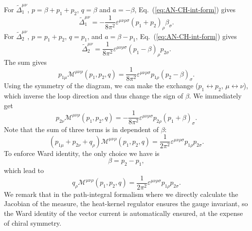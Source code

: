 \documentclass[aps,prb,superscriptaddress,nofootinbib]{revtex4}
\begin{document}
For $\tilde\Delta_{1}^{\mu\nu}$, $p=\beta+p_1+p_2$, $q=\beta$ and $a=-\beta$, Eq.~(\ref{eq:AN-CH-int-form}) gives
\begin{equation}
	\tilde\Delta^{\mu\nu}_1 = -\frac{1}{8\pi^2} \varepsilon^{\mu\nu\rho\sigma} (p_1+p_2)_\rho \beta_{\sigma}.
\end{equation}
For $\tilde\Delta_2^{\mu\nu}$, $p=p_1+p_2$, $q=p_1$, and $a=\beta-p_1$, Eq.~(\ref{eq:AN-CH-int-form}) gives
\begin{equation}
	\tilde\Delta^{\mu\nu}_2 = \frac{1}{8\pi^2} \varepsilon^{\mu\nu\rho\sigma} (p_1-\beta)_\rho p_{2\sigma}.
\end{equation}
The sum gives
\begin{equation}
	p_{1\mu} \mathcal{M}^{\mu\nu\rho}(p_1,p_2,q) = \frac{1}{8\pi^2} \varepsilon^{\mu\nu\rho\sigma} p_{1\rho}(p_{2}-\beta)_\sigma.
\end{equation}
Using the symmetry of the diagram, we can make the exchange ($p_1 \leftrightarrow p_2$, $\mu \leftrightarrow \nu$), which inverse the loop direction and thus change the sign of $\beta$.
We immediately get
\begin{equation}
	p_{2\nu} \mathcal{M}^{\mu\nu\rho}(p_1,p_2,q) = -\frac{1}{8\pi^2} \varepsilon^{\mu\nu\rho\sigma} p_{2\rho}(p_{1}+\beta)_\sigma.
\end{equation}
Note that the sum of three terms is in dependent of $\beta$:
\begin{equation}
	(p_{1\mu}+p_{2\nu}+q_{\rho}) \mathcal M^{\mu\nu\rho}(p_1,p_2,q) = \frac{1}{2\pi^2} \varepsilon^{\mu\nu\rho\sigma} p_{1\rho} p_{2\sigma}.
\end{equation}
To enforce Ward identity, the only choice we have is
\begin{equation}
	\beta = p_2-p_1,
\end{equation}
which lead to
\begin{equation}
	q_\rho \mathcal{M}^{\mu\nu\rho}(p_1,p_2,q) = \frac{1}{2\pi^2} \varepsilon^{\mu\nu\rho\sigma} p_{1\rho} p_{2\sigma}.
\end{equation}
We remark that in the path-integral formalism where we directly calculate the Jacobian of the measure, the heat-kernel regulator ensures the gauge invariant, so the Ward identity of the vector current is automatically ensured, at the expense of chiral symmetry.
\end{document}
